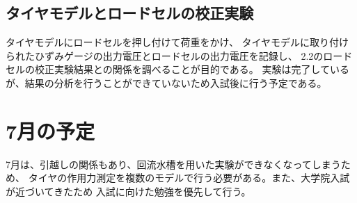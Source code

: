 \documentclass[twocolumn,a4j]{jsarticle}
\begin{document}
\subsection{タイヤモデルとロードセルの校正実験}
タイヤモデルにロードセルを押し付けて荷重をかけ、
タイヤモデルに取り付けられたひずみゲージの出力電圧とロードセルの出力電圧を記録し、
2.2のロードセルの校正実験結果との関係を調べることが目的である。
実験は完了しているが、結果の分析を行うことができていないため入試後に行う予定である。
\begin{comment}
\newpage
\section{Arduinoを用いた温湿度計の製作}
Aruduino講習会が実施されていたため、その応用として温湿度計の製作した。
温湿度計については、\href{https://prod.kyohritsu.com/KP-AM2320.html}{KP-AM2320}を用いた。
\begin{figure}[htbp]
    \begin{center}
        \texttt{[image: images/arduino.jpg]}
        \caption{thermo-hygrometer}
    \end{center}
\end{figure}
温湿度センサから出力下データを画像手前の液晶モニタに表示し、
画像左上に挿入されているSDカードに１分ごとに記録できるようにしている。
\end{comment}
\section{7月の予定}
7月は、引越しの関係もあり、回流水槽を用いた実験ができなくなってしまうため、
タイヤの作用力測定を複数のモデルで行う必要がある。また、大学院入試が近づいてきたため
入試に向けた勉強を優先して行う。
\end{document}
